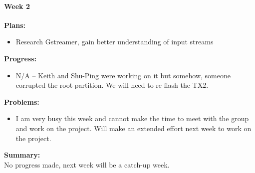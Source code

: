 \paragraph{Week 2}
\begin{adjustwidth}{2.5em}{0pt}
    \vspace{-0.5cm}\textbf{Plans:}
    \vspace{-0.5cm}
    \begin{itemize}
        \item Research Gstreamer, gain better understanding of input streams
    \end{itemize} 
    \vspace{-0.3cm}\textbf{Progress:}
    \vspace{-0.5cm}
    \begin{itemize}
        \item N/A -- Keith and Shu-Ping were working on it but somehow, someone corrupted the root partition. We will need to re-flash the TX2.
    \end{itemize} 
    \vspace{-0.3cm}\textbf{Problems:}
    \vspace{-0.5cm}
    \begin{itemize}
        \item I am very busy this week and cannot make the time to meet with the group and work on the project. Will make an extended effort next week to work on the project. 
    \end{itemize}  
    \vspace{-0.3cm}\noindent\textbf{Summary:}\\
    \noindent 
    No progress made, next week will be a catch-up week.
\end{adjustwidth}

